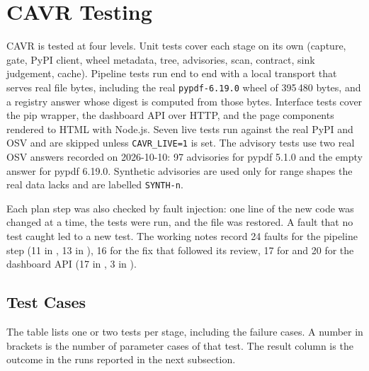 ﻿%
\section{CAVR Testing}\label{sec:cavr-testing}
\begin{sloppypar}
CAVR is tested at four levels. Unit tests cover each stage on its own (capture, gate, PyPI client, wheel metadata, tree, advisories, scan, contract, sink judgement, cache). Pipeline tests run  end to end with a local transport that serves real file bytes, including the real \texttt{pypdf-6.19.0} wheel of 395\,480 bytes, and a registry answer whose digest is computed from those bytes. Interface tests cover the pip wrapper, the dashboard API over HTTP, and the page components rendered to HTML with Node.js. Seven live tests run against the real PyPI and OSV and are skipped unless \texttt{CAVR\_LIVE=1} is set. The advisory tests use two real OSV answers recorded on 2026-10-10: 97 advisories for pypdf 5.1.0 and the empty answer for pypdf 6.19.0. Synthetic advisories are used only for range shapes the real data lacks and are labelled \texttt{SYNTH-n}.
\end{sloppypar}

\begin{sloppypar}
Each plan step was also checked by fault injection: one line of the new code was changed at a time, the tests were run, and the file was restored. A fault that no test caught led to a new test. The working notes record 24 faults for the pipeline step (11 in , 13 in ), 16 for the fix that followed its review, 17 for  and 20 for the dashboard API (17 in , 3 in ).
\end{sloppypar}

\subsection{Test Cases}
The table lists one or two tests per stage, including the failure cases. A number in brackets is the number of parameter cases of that test. The result column is the outcome in the runs reported in the next subsection.

